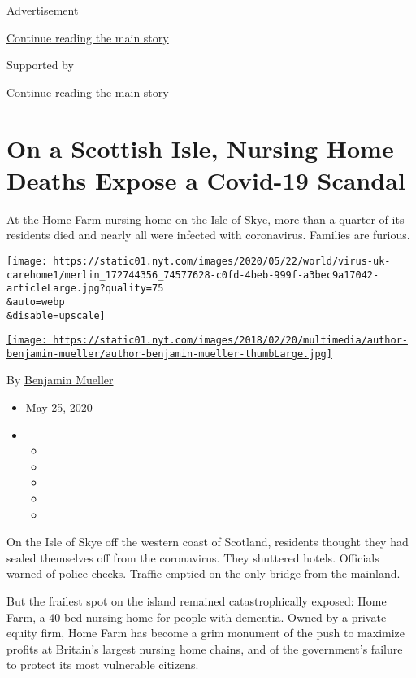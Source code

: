 Advertisement

\protect\hyperlink{after-top}{Continue reading the main story}

Supported by

\protect\hyperlink{after-sponsor}{Continue reading the main story}

\hypertarget{on-a-scottish-isle-nursing-home-deaths-expose-a-covid-19-scandal}{%
\section{On a Scottish Isle, Nursing Home Deaths Expose a Covid-19
Scandal}\label{on-a-scottish-isle-nursing-home-deaths-expose-a-covid-19-scandal}}

At the Home Farm nursing home on the Isle of Skye, more than a quarter
of its residents died and nearly all were infected with coronavirus.
Families are furious.

\texttt{[image: https://static01.nyt.com/images/2020/05/22/world/virus-uk-carehome1/merlin\_172744356\_74577628-c0fd-4beb-999f-a3bec9a17042-articleLarge.jpg?quality=75\\\&auto=webp\\\&disable=upscale]}

\href{https://www.nytimes.com/by/benjamin-mueller}{\texttt{[image: https://static01.nyt.com/images/2018/02/20/multimedia/author-benjamin-mueller/author-benjamin-mueller-thumbLarge.jpg]}}

By \href{https://www.nytimes.com/by/benjamin-mueller}{Benjamin Mueller}

\begin{itemize}
\item
  May 25, 2020
\item
  \begin{itemize}
  \item
  \item
  \item
  \item
  \item
  \end{itemize}
\end{itemize}

On the Isle of Skye off the western coast of Scotland, residents thought
they had sealed themselves off from the coronavirus. They shuttered
hotels. Officials warned of police checks. Traffic emptied on the only
bridge from the mainland.

But the frailest spot on the island remained catastrophically exposed:
Home Farm, a 40-bed nursing home for people with dementia. Owned by a
private equity firm, Home Farm has become a grim monument of the push to
maximize profits at Britain's largest nursing home chains, and of the
government's failure to protect its most vulnerable citizens.

